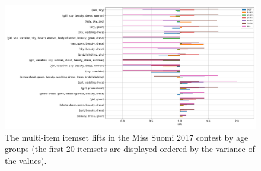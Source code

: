 \documentclass[english]{tktltiki}
\begin{document}
\clearpage
{}
\begin{figure}[h]
    \begin{center}
        \includegraphics[width=1.25\textwidth,center]{Images/itemset_lifts-age_groups-Miss_Suomi-multi_itemsets.png}
        \caption{The multi-item itemset lifts in the Miss Suomi 2017 contest by age groups (the first 20 itemsets are displayed ordered by the variance of the values).}
    \end{center}
\end{figure}

\clearpage
\end{document}
